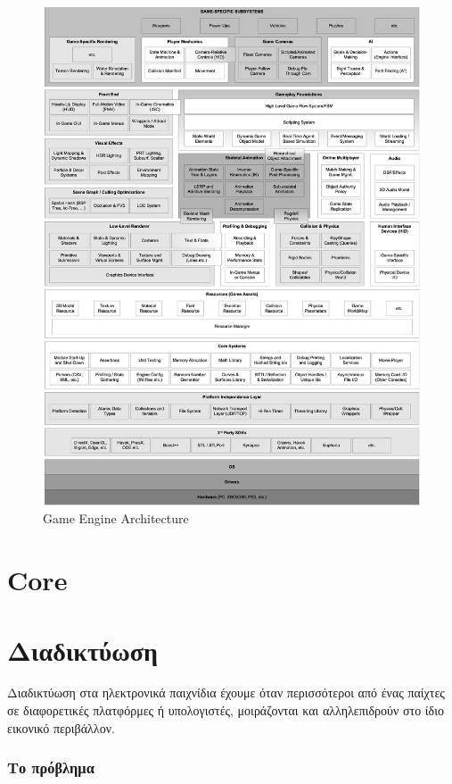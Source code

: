 \documentclass[oneside, 12pt]{book}
\begin{document}
	\begin{figure}[h]
		\centering
		\includegraphics[width=160mm]{Images/game_engine_architecture}
		\caption{Game Engine Architecture}
		\label{fig:Game Engine Architecture}
	\end{figure}	
	
	\chapter{Core}
	
	
	\chapter{Διαδικτύωση}
		Διαδικτύωση στα ηλεκτρονικά παιχνίδια έχουμε όταν περισσότεροι από ένας παίχτες σε διαφορετικές πλατφόρμες ή υπολογιστές, μοιράζονται και αλληλεπιδρούν στο ίδιο εικονικό περιβάλλον. 
		
		\subsection{Το πρόβλημα}
\end{document}
